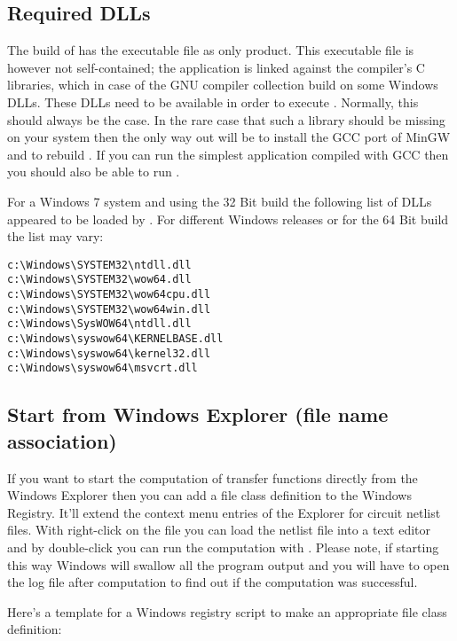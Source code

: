 \subsection{Required DLLs}

The build of \linnet{} has the executable file  as only
product. This executable file is however not self-contained; the
application is linked against the compiler's C libraries, which in case of
the GNU compiler collection build on some Windows DLLs. These DLLs need to
be available in order to execute \linnet{}. Normally, this should always
be the case. In the rare case that such a library should be missing on
your system then the only way out will be to install the GCC port of MinGW
and to rebuild \linnet{}. If you can run the simplest 
application compiled with GCC then you should also be able to run
\linnet{}.

For a Windows 7 system and using the 32 Bit build the following list of
DLLs appeared to be loaded by \linnet{}. For different Windows releases or
for the 64 Bit build the list may vary:

\begin{verbatim}
c:\Windows\SYSTEM32\ntdll.dll
c:\Windows\SYSTEM32\wow64.dll
c:\Windows\SYSTEM32\wow64cpu.dll
c:\Windows\SYSTEM32\wow64win.dll
c:\Windows\SysWOW64\ntdll.dll
c:\Windows\syswow64\KERNELBASE.dll
c:\Windows\syswow64\kernel32.dll
c:\Windows\syswow64\msvcrt.dll
\end{verbatim}


\subsection{Start from Windows Explorer (file name association)}

If you want to start the computation of transfer functions directly from
the Windows Explorer then you can add a file class definition to the
Windows Registry. It'll extend the context menu entries of the Explorer
for circuit netlist files. With right-click on the file you can load the
netlist file into a text editor and by double-click you can run the
computation with \linnet{}. Please note, if starting \linnet{} this way
Windows will swallow all the program output and you will have to open the
log file after computation to find out if the computation was successful.

Here's a template for a Windows registry script to make an appropriate
file class definition:

